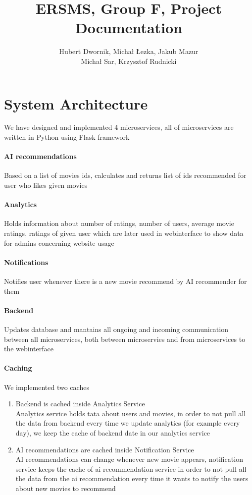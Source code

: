 \documentclass{article}[11pt]
\title{ERSMS, Group F, Project Documentation}
\author{Hubert Dwornik, Michał Łezka, Jakub Mazur \\ Michał Sar, Krzysztof Rudnicki}
\begin{document}
\maketitle

\section{System Architecture} 
We have designed and implemented 4 microservices,
all of microservices are written in Python using Flask framework
\paragraph{AI recommendations}
Based on a list of movies ids, calculates and returns list of ids recommended for user who likes given movies
\paragraph{Analytics}
Holds information about number of 
ratings, number of users, 
average movie ratings, ratings of 
given user which are later used in 
webinterface to show data for admins 
concerning website usage
\paragraph{Notifications}
Notifies user whenever there is a new movie recommend by AI recommender for them 
\paragraph{Backend}
Updates database and mantains all ongoing and incoming communication between all microservices, both between microservies and from microservices to the webinterface
\paragraph{Caching}
We implemented two caches
\begin{enumerate}
    \item Backend is cached inside Analytics Service \\
    Analytics service holds tata about users and movies, 
    in order to not pull all the data from backend every time we update analytics
    (for example every day), we keep the cache of backend date in our analytics 
    service
    \item AI recommendations are cached inside Notification Service \\ 
    AI recommendations can change whenever new movie appears, notification 
    service keeps the cache of ai recommendation service in order to not 
    pull all the data from the ai recommendation every time it wants to notify 
    the users about new movies to recommend
\end{enumerate}
\end{document}
